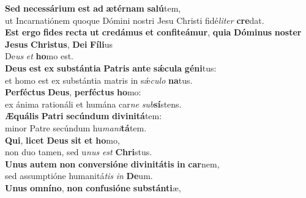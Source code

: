 \oddverse \textbf{Sed} \textbf{ne}\textbf{ces}\textbf{sá}\textbf{ri}\textbf{um} \textbf{est} \textbf{ad} \textbf{æ}\textbf{tér}\textbf{nam} \textbf{sa}\textbf{lú}tem,~\*\\
\oddverse ut Incarnatiónem quoque Dómini nostri Jesu Christi fidé\textit{li}\textit{ter} \textbf{cre}dat.\\
\evenverse \textbf{Est} \textbf{er}\textbf{go} \textbf{fi}\textbf{des} \textbf{re}\textbf{cta} \textbf{ut} \textbf{cre}\textbf{dá}\textbf{mus} \textbf{et} \textbf{con}\textbf{fi}\textbf{te}\textbf{á}\textbf{mur}, \textbf{qui}\textbf{a} \textbf{Dó}\textbf{mi}\textbf{nus} \textbf{no}\textbf{ster} \textbf{Je}\textbf{sus} \textbf{Chri}\textbf{stus}, \textbf{De}\textbf{i} \textbf{Fí}\textbf{li}us~\*\\
\evenverse De\textit{us} \textit{et} \textbf{ho}mo est.\\
\oddverse \textbf{De}\textbf{us} \textbf{est} \textbf{ex} \textbf{sub}\textbf{stán}\textbf{ti}\textbf{a} \textbf{Pa}\textbf{tris} \textbf{an}\textbf{te} \textbf{sǽ}\textbf{cu}\textbf{la} \textbf{gé}\textbf{ni}tus:~\*\\
\oddverse et homo est ex substántia matris in sǽ\textit{cu}\textit{lo} \textbf{na}tus.\\
\evenverse \textbf{Per}\textbf{fé}\textbf{ctus} \textbf{De}\textbf{us}, \textbf{per}\textbf{fé}\textbf{ctus} \textbf{ho}mo:~\*\\
\evenverse ex ánima rationáli et humána car\textit{ne} \textit{sub}\textbf{sí}stens.\\
\oddverse \textbf{Æ}\textbf{quá}\textbf{lis} \textbf{Pa}\textbf{tri} \textbf{se}\textbf{cún}\textbf{dum} \textbf{di}\textbf{vi}\textbf{ni}\textbf{tá}tem:~\*\\
\oddverse minor Patre secúndum hu\textit{ma}\textit{ni}\textbf{tá}tem.\\
\evenverse \textbf{Qui}, \textbf{li}\textbf{cet} \textbf{De}\textbf{us} \textbf{sit} \textbf{et} \textbf{ho}mo,~\*\\
\evenverse non duo tamen, sed u\textit{nus} \textit{est} \textbf{Chri}stus.\\
\oddverse \textbf{U}\textbf{nus} \textbf{au}\textbf{tem} \textbf{non} \textbf{con}\textbf{ver}\textbf{si}\textbf{ó}\textbf{ne} \textbf{di}\textbf{vi}\textbf{ni}\textbf{tá}\textbf{tis} \textbf{in} \textbf{car}nem,~\*\\
\oddverse sed assumptióne humanitá\textit{tis} \textit{in} \textbf{De}um.\\
\evenverse \textbf{U}\textbf{nus} \textbf{om}\textbf{ní}\textbf{no}, \textbf{non} \textbf{con}\textbf{fu}\textbf{si}\textbf{ó}\textbf{ne} \textbf{sub}\textbf{stán}\textbf{ti}æ,~\*\\
